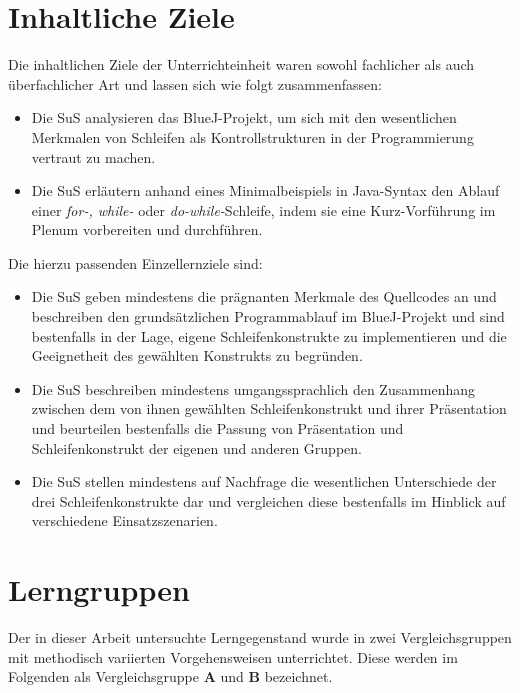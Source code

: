\documentclass[paper=a4, DIV=13, BCOR=12mm, twoside=on, onecolumn=on, open = any, titlepage =on, parskip =half-, headsepline = on, footsepline = on, chapterprefix = on, sectionprefix = on, appendixprefix = off, fontsize = 11pt, numbers = noenddot, abstract = off]{scrreprt}
\begin{document}
\par \singlespacing
 \section{Inhaltliche Ziele}
\onehalfspacing
Die inhaltlichen Ziele der Unterrichteinheit waren sowohl fachlicher als auch überfachlicher Art und lassen sich wie folgt zusammenfassen:
\begin{itemize}
\item Die SuS analysieren das BlueJ-Projekt, um sich mit den wesentlichen Merkmalen von Schleifen als Kontrollstrukturen in der Programmierung vertraut zu machen.
\item Die SuS erläutern anhand eines Minimalbeispiels in Java-Syntax den Ablauf einer \emph{for-, while-} oder \emph{do-while-}Schleife, indem sie eine Kurz-Vorführung im Plenum vorbereiten und durchführen.
\end{itemize}
Die hierzu passenden Einzellernziele sind:
\begin{itemize}
\item Die SuS geben mindestens die prägnanten Merkmale des Quellcodes an und beschreiben den grundsätzlichen Programmablauf im BlueJ-Projekt und sind bestenfalls in der Lage, eigene Schleifenkonstrukte zu implementieren und die Geeignetheit des gewählten Konstrukts zu begründen.
\item Die SuS beschreiben mindestens umgangssprachlich den Zusammenhang zwischen dem von ihnen gewählten Schleifenkonstrukt und ihrer Präsentation und beurteilen bestenfalls die Passung von Präsentation und Schleifenkonstrukt der eigenen und anderen Gruppen.
\item Die SuS stellen mindestens auf Nachfrage die wesentlichen Unterschiede der drei Schleifenkonstrukte dar und vergleichen diese bestenfalls im Hinblick auf verschiedene Einsatzszenarien.
\end{itemize}


\par \singlespacing
 \section{Lerngruppen}
\onehalfspacing
Der in dieser Arbeit untersuchte Lerngegenstand wurde in zwei Vergleichsgruppen mit methodisch variierten Vorgehensweisen unterrichtet. Diese werden im Folgenden als Vergleichsgruppe \textsc{\textbf{A}} und \textsc{\textbf{B}} bezeichnet.
\end{document}
